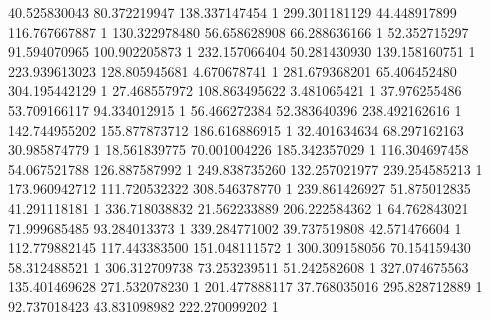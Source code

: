 40.525830043	80.372219947	138.337147454	1
299.301181129	44.448917899	116.767667887	1
130.322978480	56.658628908	66.288636166	1
52.352715297	91.594070965	100.902205873	1
232.157066404	50.281430930	139.158160751	1
223.939613023	128.805945681	4.670678741	1
281.679368201	65.406452480	304.195442129	1
27.468557972	108.863495622	3.481065421	1
37.976255486	53.709166117	94.334012915	1
56.466272384	52.383640396	238.492162616	1
142.744955202	155.877873712	186.616886915	1
32.401634634	68.297162163	30.985874779	1
18.561839775	70.001004226	185.342357029	1
116.304697458	54.067521788	126.887587992	1
249.838735260	132.257021977	239.254585213	1
173.960942712	111.720532322	308.546378770	1
239.861426927	51.875012835	41.291118181	1
336.718038832	21.562233889	206.222584362	1
64.762843021	71.999685485	93.284013373	1
339.284771002	39.737519808	42.571476604	1
112.779882145	117.443383500	151.048111572	1
300.309158056	70.154159430	58.312488521	1
306.312709738	73.253239511	51.242582608	1
327.074675563	135.401469628	271.532078230	1
201.477888117	37.768035016	295.828712889	1
92.737018423	43.831098982	222.270099202	1
